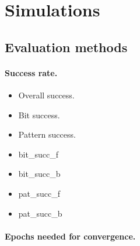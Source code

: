
\section{Simulations}

 

\subsection{Evaluation methods} 
\label{sec:sim-evaluation-methods} 

\paragraph{Success rate.} 

\begin{itemize}
\item Overall success. 
\item Bit success. 
\item Pattern success. 

\item bit\_succ\_f
\item bit\_succ\_b
\item pat\_succ\_f 
\item pat\_succ\_b
\end{itemize} 

\paragraph{Epochs needed for convergence.} 


